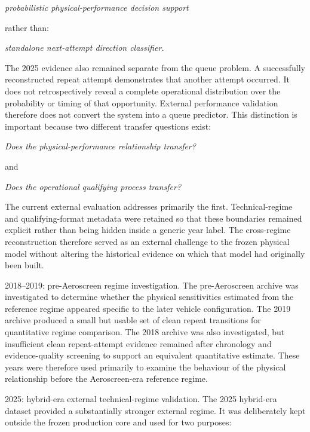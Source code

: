 \begin{center}\textit{probabilistic physical-performance decision support}\end{center}

rather than:

\begin{center}\textit{standalone next-attempt direction classifier.}\end{center}

The 2025 evidence also remained separate from the queue problem. A successfully reconstructed repeat attempt demonstrates that another attempt occurred. It does not retrospectively reveal a complete operational distribution over the probability or timing of that opportunity. External performance validation therefore does not convert the system into a queue predictor. This distinction is important because two different transfer questions exist:

\begin{center}\textit{Does the physical-performance relationship transfer?}\end{center}

and

\begin{center}\textit{Does the operational qualifying process transfer?}\end{center}

The current external evaluation addresses primarily the first. Technical-regime and qualifying-format metadata were retained so that these boundaries remained explicit rather than being hidden inside a generic year label. The cross-regime reconstruction therefore served as an external challenge to the frozen physical model without altering the historical evidence on which that model had originally been built.

2018--2019: pre-Aeroscreen regime investigation. The pre-Aeroscreen archive was investigated to determine whether the physical sensitivities estimated from the reference regime appeared specific to the later vehicle configuration. The 2019 archive produced a small but usable set of clean repeat transitions for quantitative regime comparison. The 2018 archive was also investigated, but insufficient clean repeat-attempt evidence remained after chronology and evidence-quality screening to support an equivalent quantitative estimate. These years were therefore used primarily to examine the behaviour of the physical relationship before the Aeroscreen-era reference regime.

2025: hybrid-era external technical-regime validation. The 2025 hybrid-era dataset provided a substantially stronger external regime. It was deliberately kept outside the frozen production core and used for two purposes:

